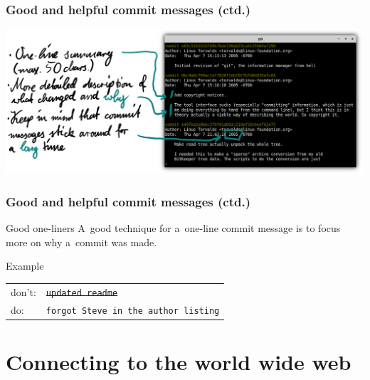 \documentclass[12pt]{beamer}
\begin{document}
\begin{frame}
  \frametitle{Good and helpful commit messages (ctd.)}

  \begin{center}
    \includegraphics[width=\textwidth]{images/good-commit-message.png}
  \end{center}
\end{frame}

\begin{frame}
  \frametitle{Good and helpful commit messages (ctd.)}

  \begin{block}{Good one-liners}
    A~good technique for a~one-line commit message is to focus more on
    \alert{why} a~commit was made.\\
  \end{block}

  \begin{block}{Example}
    \begin{tabular}{@{}ll@{}}
      don't: & \sout{\texttt{updated readme}} \\
      do:    & \texttt{forgot Steve in the author listing} \\
    \end{tabular}
  \end{block}
\end{frame}



\section{Connecting to the world wide web}




\end{document}
